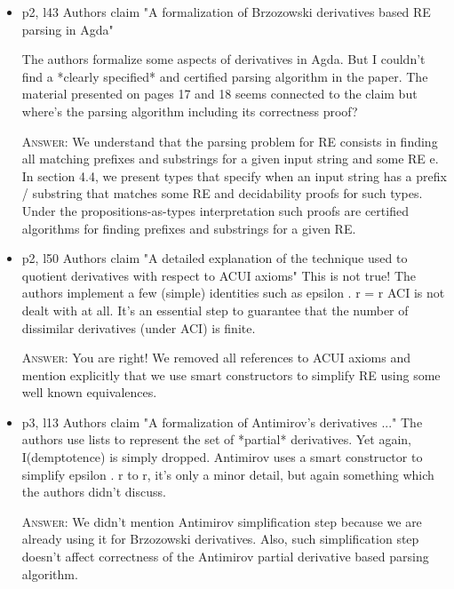 \documentclass{article}
\begin{document}
\begin{itemize}

    \item p2, l43 Authors claim "A formalization of Brzozowski derivatives based RE parsing in Agda"

          The authors formalize some aspects of derivatives in Agda. But I couldn't find
          a *clearly specified* and certified parsing algorithm in the paper.
          The material presented on pages 17 and 18 seems connected to the claim but
          where's the parsing algorithm including its correctness proof?

    \textsc{Answer}: We understand that the parsing problem for RE consists in finding all matching prefixes and 
          substrings for a given input string and some RE e. In section 4.4, we present types that specify 
          when an input string has a prefix / substring that matches some RE and decidability proofs 
          for such types. Under the propositions-as-types interpretation such proofs are certified algorithms 
          for finding prefixes and substrings for a given RE.

     \item p2, l50 Authors claim "A detailed explanation of the technique used to quotient derivatives with respect to ACUI axioms"
           This is not true! The authors implement a few (simple) identities such as epsilon . r = r
           ACI is not dealt with at all. It's an essential step to guarantee that the number of dissimilar derivatives (under ACI) is finite.
           
    \textsc{Answer}: You are right! We removed all references to ACUI axioms and mention explicitly that we use smart constructors to 
           simplify RE using some well known equivalences.       
          

    \item p3, l13 Authors claim "A formalization of Antimirov's derivatives ..."
          The authors use lists to represent the set of *partial* derivatives. Yet again, I(demptotence) is simply dropped.
          Antimirov uses a smart constructor to simplify epsilon . r to r, it's only a minor detail, but again
          something which the authors didn't discuss.
          
    \textsc{Answer}: We didn't mention Antimirov simplification step because we are already using it for Brzozowski derivatives.
        Also, such simplification step doesn't affect correctness of the Antimirov partial derivative based parsing
        algorithm.
        

\end{itemize}
\end{document}
